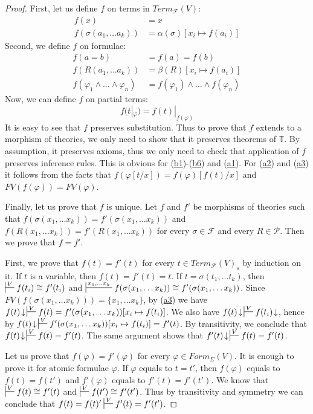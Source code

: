 \documentclass[reqno]{amsart}
\newcommand{\axref}[1]{(\hyperref[ax:#1]{#1})}
\theoremstyle{definition}
\theoremstyle{remark}
\numberwithin{figure}{section}
\begin{document}
\begin{proof}
First, let us define $f$ on terms in $Term_\mathcal{F}(V)$:
\begin{align*}
f(x) & = x \\
f(\sigma(a_1, \ldots a_k)) & = \alpha(\sigma)[x_i \mapsto f(a_i)]
\end{align*}
Second, we define $f$ on formulae:
\begin{align*}
f(a = b) & = f(a) = f(b) \\
f(R(a_1, \ldots a_k)) & = \beta(R)[x_i \mapsto f(a_i)] \\
f(\varphi_1 \land \ldots \land \varphi_n) & = f(\varphi_1) \land \ldots \land f(\varphi_n)
\end{align*}
Now, we can define $f$ on partial terms:
\[ f(t|_\varphi) = f(t)|_{f(\varphi)} \]
It is easy to see that $f$ preserves substitution.
Thus to prove that $f$ extends to a morphism of theories, we only need to show that it preserves theorems of $\mathbb{T}$.
By assumption, it preserves axioms, thus we only need to check that application of $f$ preserves inference rules.
This is obvious for \axref{b1}-\axref{b6} and \axref{a1}.
For \axref{a2} and \axref{a3} it follows from the facts that $f(\varphi[t/x]) = f(\varphi)[f(t)/x]$ and $FV(f(\varphi)) = FV(\varphi)$.

Finally, let us prove that $f$ is unique.
Let $f$ and $f'$ be morphisms of theories such that $f(\sigma(x_1, \ldots x_k)) = f'(\sigma(x_1, \ldots x_k))$ and
    $f(R(x_1, \ldots x_k)) = f'(R(x_1, \ldots x_k))$ for every $\sigma \in \mathcal{F}$ and every $R \in \mathcal{P}$.
Then we prove that $f = f'$.

First, we prove that $f(t) = f'(t)$ for every $t \in Term_\mathcal{F}(V)_s$ by induction on it.
If $t$ is a variable, then $f(t) = f'(t) = t$.
If $t = \sigma(t_1, \ldots t_k)$, then $\sststile{}{V} f(t_i) \cong f'(t_i)$
and $\sststile{}{x_1, \ldots x_k} f(\sigma(x_1, \ldots x_k)) \cong f'(\sigma(x_1, \ldots x_k))$.
Since $FV(f(\sigma(x_1, \ldots x_k))) = \{ x_1, \ldots x_k\}$, by \axref{a3} we have
$f(t)\!\downarrow\,\sststile{}{V} f(t) = f'(\sigma(x_1, \ldots x_k))[x_i \mapsto f(t_i)]$.
We also have $f(t)\!\downarrow\,\sststile{}{V} f(t_i)\!\downarrow$, hence by 
$f(t)\!\downarrow\,\sststile{}{V} f'(\sigma(x_1, \ldots x_k))[x_i \mapsto f(t_i)] = f'(t)$.
By transitivity, we conclude that $f(t)\!\downarrow\,\sststile{}{V} f(t) = f'(t)$.
The same argument shows that $f'(t)\!\downarrow\,\sststile{}{V} f(t) = f'(t)$.

Let us prove that $f(\varphi) = f'(\varphi)$ for every $\varphi \in Form_\Sigma(V)$.
It is enough to prove it for atomic formulae $\varphi$.
If $\varphi$ equals to $t = t'$, then $f(\varphi)$ equals to $f(t) = f(t')$ and $f'(\varphi)$ equals to $f'(t) = f'(t')$.
We know that $\sststile{}{V} f(t) \cong f'(t)$ and $\sststile{}{V} f(t') \cong f'(t')$.
Thus by transitivity and symmetry we can conclude that $f(t) = f(t)' \sststile{}{V} f'(t) = f'(t')$.


\end{proof}
\end{document}
